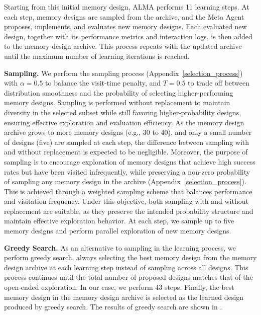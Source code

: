 \documentclass{article}
\theoremstyle{plain}
\theoremstyle{definition}
\theoremstyle{remark}
\newcommand{\ouralgo}{ALMA\xspace} %
\begin{document}
Starting from this initial memory design, \ouralgo performs 11 learning steps. 
At each step, memory designs are sampled from the archive, and the Meta Agent 
proposes, implements, and evaluates new memory designs. Each evaluated new design, together 
with its performance metrics and interaction logs, is then added to the memory design archive. 
This process repeats with the updated archive until the maximum number of learning 
iterations is reached.

\noindent\textbf{Sampling.}\hspace{0.5em} 
We perform the sampling process (Appendix~\ref{selection_process}) with 
$\alpha=0.5$ to balance the visit-time penalty, and $T=0.5$ to trade off between 
distribution smoothness and the probability of selecting higher-performing memory designs. 
Sampling is performed without replacement to maintain diversity in the selected subset 
while still favoring higher-probability designs, ensuring effective exploration and 
evaluation efficiency. As the memory design archive grows to more memory designs 
(e.g., 30 to 40), and only a small number of designs (five) are sampled at each 
step, the difference between sampling with and without replacement is expected to be 
negligible. Moreover, the purpose of sampling is to encourage exploration of memory designs that achieve 
high success rates but have been visited infrequently, while preserving a non-zero 
probability of sampling any memory design in the archive (Appendix~\ref{selection_process}). This is achieved through 
a weighted sampling scheme that balances performance and visitation frequency. 
Under this objective, both sampling with and without replacement are suitable, as 
they preserve the intended probability structure and maintain effective exploration 
behavior.
At each step, we sample up to five memory designs and perform parallel exploration of new memory designs.

\noindent\textbf{Greedy Search.}\hspace{0.5em} 
As an alternative to sampling in the learning process, we perform greedy search, 
always selecting the best memory design from the memory design archive at each learning step 
instead of sampling across all designs. This process continues until the total number 
of proposed designs matches that of the open-ended exploration. In our case, we perform 43 steps.
Finally, the best memory design in the memory design archive is selected as the learned design produced by greedy search. The results of greedy search are shown in .
\end{document}
